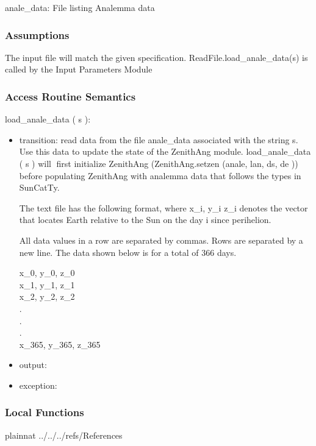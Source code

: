 \documentclass[12pt, titlepage]{article}
\begin{document}
anale\_data: File listing Analemma data


\subsubsection{Assumptions}
The input file will match the given specification.
ReadFile.load\_anale\_data(s) is called by the Input Parameters Module

\subsubsection{ Access Routine Semantics}


\noindent  load\_anale\_data ( s ):
\begin{itemize}
\item transition: read data from the file anale\_data associated with the string s. Use
this data to update the state of the ZenithAng module. load\_anale\_data ( s ) will first initialize ZenithAng (ZenithAng.setzen (anale, lan, ds, de )) before populating ZenithAng with analemma data that follows the types in SunCatTy.

The text file has the following format, where x\_i, y\_i z\_i denotes the vector that locates
Earth relative to the Sun on the day i since perihelion.

All data values in a row are separated by commas. Rows are separated by a new line. The data shown below is for a total of 366 days.
\begin{center}
x\_0,   y\_0,   z\_0\\
x\_1,   y\_1,   z\_1\\
x\_2,   y\_2,   z\_2\\
.\\
.\\
.\\
x\_365,   y\_365,   z\_365\\
\end{center}
\item output: 
\item exception: 
\end{itemize}
 

\subsubsection{Local Functions}


\newpage

 {plainnat}
 {../../../refs/References}
\end{document}
